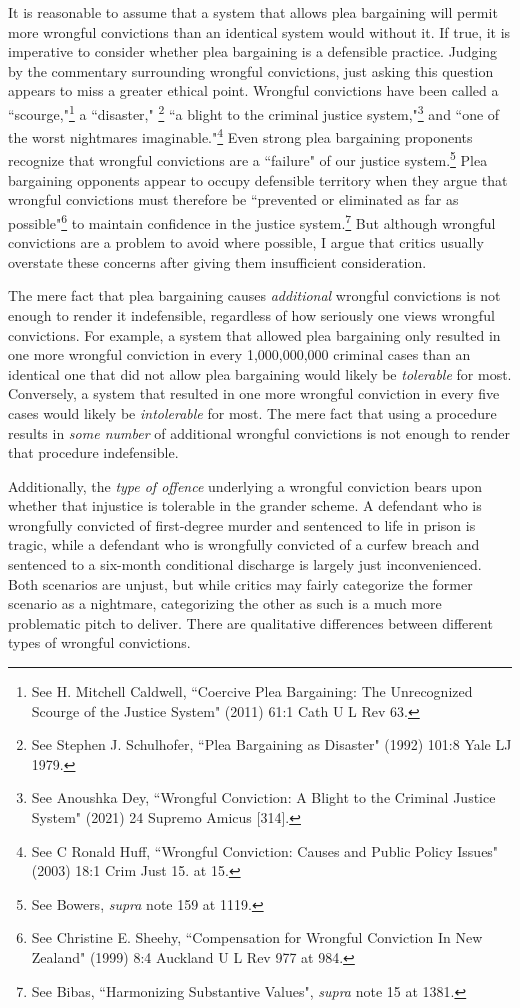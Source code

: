 It is reasonable to assume that a system that allows plea bargaining will permit more wrongful convictions than an identical system would without it. If true, it is imperative to consider whether plea bargaining is a defensible practice. Judging by the commentary surrounding wrongful convictions, just asking this question appears to miss a greater ethical point. Wrongful convictions have been called a ``scourge,"\footnote{See H. Mitchell Caldwell, ``Coercive Plea Bargaining: The Unrecognized Scourge of the Justice System" (2011) 61:1 Cath U L Rev 63.} a ``disaster," \footnote{See Stephen J. Schulhofer, ``Plea Bargaining as Disaster" (1992) 101:8 Yale LJ 1979.} ``a blight to the criminal justice system,"\footnote{See Anoushka Dey, ``Wrongful Conviction: A Blight to the Criminal Justice System" (2021)
24 Supremo Amicus [314].} and ``one of the worst nightmares imaginable."\footnote{See C Ronald Huff, ``Wrongful Conviction: Causes and Public Policy Issues" (2003) 18:1 Crim Just 15. at 15.} Even strong plea bargaining proponents recognize that wrongful convictions are a ``failure" of our justice system.\footnote{See Bowers, \textit{supra} note 159 at 1119.} Plea bargaining opponents appear to occupy defensible territory when they argue that wrongful convictions must therefore be ``prevented or eliminated as far as possible"\footnote{See Christine E. Sheehy, ``Compensation for Wrongful Conviction In New Zealand" (1999) 8:4 Auckland U L Rev 977 at 984.} to maintain confidence in the justice system.\footnote{See Bibas, ``Harmonizing Substantive Values", \textit{supra} note 15 at 1381.} But although wrongful convictions are a problem to avoid where possible, I argue that critics usually overstate these concerns after giving them insufficient consideration.

The mere fact that plea bargaining causes \textit{additional} wrongful convictions is not enough to render it indefensible, regardless of how seriously one views wrongful convictions. For example, a system that allowed plea bargaining only resulted in one more wrongful conviction in every 1,000,000,000 criminal cases than an identical one that did not allow plea bargaining would likely be \textit{tolerable} for most. Conversely, a system that resulted in one more wrongful conviction in every five cases would likely be \textit{intolerable} for most. The mere fact that using a procedure results in \textit{some number} of additional wrongful convictions is not enough to render that procedure indefensible. 

Additionally, the \textit{type of offence} underlying a wrongful conviction bears upon whether that injustice is tolerable in the grander scheme. A defendant who is wrongfully convicted of first-degree murder and sentenced to life in prison is tragic, while a defendant who is wrongfully convicted of a curfew breach and sentenced to a six-month conditional discharge is largely just inconvenienced. Both scenarios are unjust, but while critics may fairly categorize the former scenario as a nightmare, categorizing the other as such is a much more problematic pitch to deliver. There are qualitative differences between different types of wrongful convictions.


